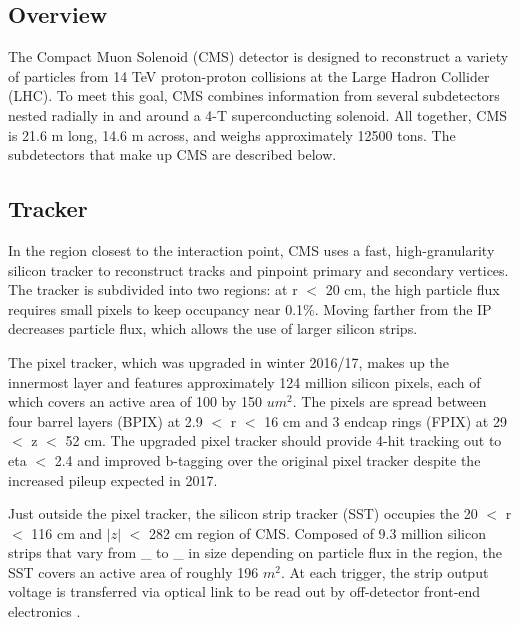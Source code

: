 \documentclass[12pt]{article}
\begin{document}
\subsection{Overview}
    The Compact Muon Solenoid (CMS) detector is designed to reconstruct a variety of particles from 14 TeV proton-proton collisions at the Large Hadron Collider (LHC). To meet this goal, CMS combines information from several subdetectors nested radially in and around a 4-T superconducting solenoid. All together, CMS is 21.6 m long, 14.6 m across, and weighs approximately 12500 tons. The subdetectors that make up CMS are described below.

\subsection{Tracker}
    In the region closest to the interaction point, CMS uses a fast, high-granularity silicon tracker to reconstruct tracks and pinpoint primary and secondary vertices. The tracker is subdivided into two regions: at r $<$ 20 cm, the high particle flux  requires small pixels to keep occupancy near 0.1\%. Moving farther from the IP decreases particle flux, which allows the use of larger silicon strips.

    The pixel tracker, which was upgraded in winter 2016/17, makes up the innermost layer and features approximately 124 million silicon pixels, each of which covers an active area of 100 by 150 $um^2$. The pixels are spread between four barrel layers (BPIX) at 2.9 $<$ r $<$ 16 cm and 3 endcap rings (FPIX) at 29 $<$ z $<$ 52 cm. The upgraded pixel tracker should provide 4-hit tracking out to eta $<$ 2.4 and improved b-tagging over the original pixel tracker despite the increased pileup expected in 2017.
    
    Just outside the pixel tracker, the silicon strip tracker (SST) occupies the 20 $<$ r $<$ 116 cm and $|z|$ $<$ 282 cm region of CMS. Composed of 9.3 million silicon strips that vary from \_ to \_ in size  depending on particle flux in the region, the SST covers an active area of roughly 196 $m^2$. At each trigger, the strip output voltage is transferred via optical link to be read out by off-detector front-end electronics .
\end{document}
